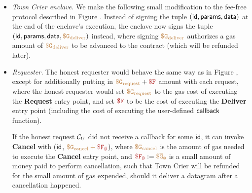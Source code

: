 \begin{itemize}[leftmargin=5mm]
\item
{\it Town Crier enclave.}
We make the following small modification to the fee-free protocol
described in Figure .
Instead of signing the tuple $({\sf id}, {\sf params}, {\sf data})$
at the end of the enclave's execution, the enclave now signs 
the tuple $({\sf id}, {\sf params}, {\sf data}, 
\tt {\color{brown} \$ G_{\text{deliver}} })$
instead, where signing 
$\tt {\color{brown} \$ G_{\text{deliver}} }$ authorizes a
gas amount of $\tt {\color{brown} \$ G_{\text{deliver}} }$ to be advanced
to the contract (which will be refunded later).
\item
{\it Requester.}
The honest requester would behave the same way as in Figure ,
except for additionally putting 
in $\sbrown{\$ G_{\text{request}}} + \smaroon{\$ F}$ 
amount with each request, 
where the honest 
requester would set  
$\tt {\color{brown} \$ G_{\text{request}} }$
to the gas cost of executing the  
{\bf Request} entry point,
and set $\smaroon{\$ F}$ to be the cost 
of executing the {\bf Deliver} entry point (including
the cost of executing the user-defined ${\sf callback}$ function).

If the honest request ${\cal C}_U$ did not receive
a callback for some ${\sf id}$,  
it can invoke {\bf Cancel}
with (${\sf id}$, $\sbrown{\$ G_{\text{cancel}} + \smaroon{\$ {F}_\emptyset}}$),
where $\tt {\color{brown} \$ G_{\text{cancel}} }$ is the amount of gas needed 
to execute the {\bf Cancel} entry point, and $\smaroon{\$ {F}_{\emptyset}} := 
\sbrown{\$ \overline{G}_{\emptyset}}$
is a small amount of money paid to perform cancellation, 
such that Town Crier will be refunded for the small amount of gas expended,
should it deliver a datagram after a cancellation happened.
\end{itemize}


